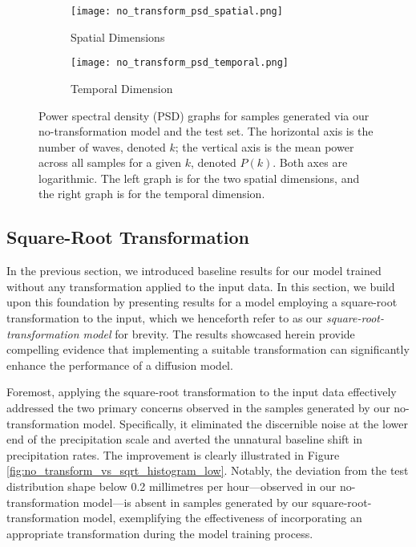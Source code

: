 \documentclass[ oneside,%
                    author={George Herbert},
                    degree={MSci},
                     title={Video Diffusion Models for Climate Simulations},
                  subtitle={}]{dissertation}
\begin{document}
\begin{figure}[htbp]
      \centering
      \begin{subfigure}{0.49\textwidth}
            \texttt{[image: no\_transform\_psd\_spatial.png]}
            \caption{Spatial Dimensions}
      \end{subfigure}
      \begin{subfigure}{0.49\textwidth}
            \texttt{[image: no\_transform\_psd\_temporal.png]}
            \caption{Temporal Dimension}
      \end{subfigure}
      \caption{Power spectral density (PSD) graphs for samples generated via our no-transformation model and the test set. The horizontal axis is the number of waves, denoted $k$; the vertical axis is the mean power across all samples for a given $k$, denoted $P(k)$. Both axes are logarithmic. The left graph is for the two spatial dimensions, and the right graph is for the temporal dimension.}
      \label{fig:no_transform_psd}
\end{figure}

\subsection{Square-Root Transformation}
\label{sec:results_square_root}

In the previous section, we introduced baseline results for our model trained without any transformation applied to the input data. In this section, we build upon this foundation by presenting results for a model employing a square-root transformation to the input, which we henceforth refer to as our \textit{square-root-transformation model} for brevity. The results showcased herein provide compelling evidence that implementing a suitable transformation can significantly enhance the performance of a diffusion model.

Foremost, applying the square-root transformation to the input data effectively addressed the two primary concerns observed in the samples generated by our no-transformation model. Specifically, it eliminated the discernible noise at the lower end of the precipitation scale and averted the unnatural baseline shift in precipitation rates. The improvement is clearly illustrated in Figure \ref{fig:no_transform_vs_sqrt_histogram_low}. Notably, the deviation from the test distribution shape below 0.2 millimetres per hour---observed in our no-transformation model---is absent in samples generated by our square-root-transformation model, exemplifying the effectiveness of incorporating an appropriate transformation during the model training process.
\end{document}
